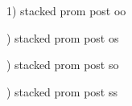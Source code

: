 \documentclass{article}
\begin{document}

1) stacked prom  post oo

\begin{center}

\end{center}

) stacked prom post os
\begin{center}

\end{center}

) stacked prom post so
\begin{center}

\end{center}

) stacked prom post ss
\begin{center}

\end{center}
\end{document}
